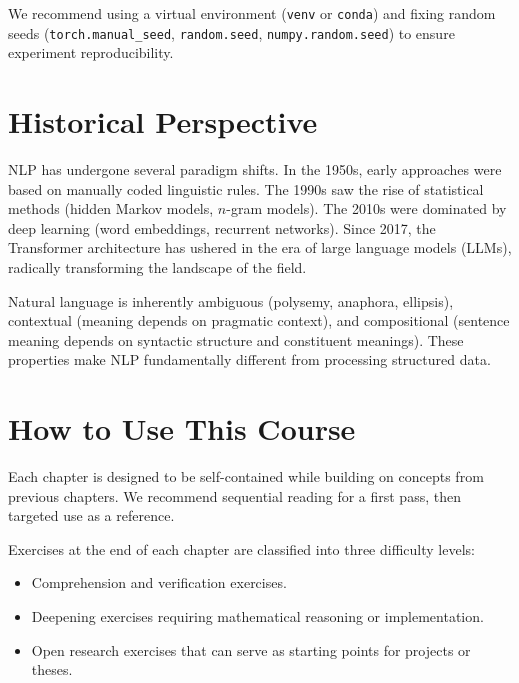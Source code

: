 \begin{bestpractice}[title=\textbf{Reproducible environment}]
We recommend using a virtual environment (\texttt{venv} or \texttt{conda}) and
fixing random seeds (\texttt{torch.manual\_seed}, \texttt{random.seed},
\texttt{numpy.random.seed}) to ensure experiment reproducibility.
\end{bestpractice}

\section*{Historical Perspective}

NLP has undergone several paradigm shifts. In the 1950s, early approaches were
based on manually coded linguistic rules. The 1990s saw the rise of statistical
methods (hidden Markov models, $n$-gram models). The 2010s were dominated by
deep learning (word embeddings, recurrent networks). Since 2017, the Transformer
architecture has ushered in the era of large language models (LLMs), radically
transforming the landscape of the field.

\begin{intuition}[title=\textbf{Why is language hard?}]
Natural language is inherently ambiguous (polysemy, anaphora, ellipsis),
contextual (meaning depends on pragmatic context), and compositional (sentence
meaning depends on syntactic structure and constituent meanings). These
properties make NLP fundamentally different from processing structured data.
\end{intuition}

\section*{How to Use This Course}

Each chapter is designed to be self-contained while building on concepts from
previous chapters. We recommend sequential reading for a first pass, then
targeted use as a reference.

Exercises at the end of each chapter are classified into three difficulty levels:
\begin{itemize}
    \item[$\star$] Comprehension and verification exercises.
    \item[$\star\star$] Deepening exercises requiring mathematical reasoning or
          implementation.
    \item[$\star\star\star$] Open research exercises that can serve as starting
          points for projects or theses.
\end{itemize}

